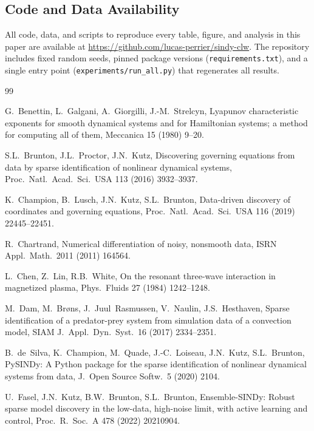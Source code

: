 \documentclass[12pt]{article}
\begin{document}
\subsection*{Code and Data Availability}

All code, data, and scripts to reproduce every table, figure, and analysis in this paper are available at \url{https://github.com/lucas-perrier/sindy-clw}.
The repository includes fixed random seeds, pinned package versions (\texttt{requirements.txt}), and a single entry point (\texttt{experiments/run\_all.py}) that regenerates all results.



\begin{thebibliography}{99}

G.~Benettin, L.~Galgani, A.~Giorgilli, J.-M.~Strelcyn,
Lyapunov characteristic exponents for smooth dynamical systems and for {H}amiltonian systems; a method for computing all of them,
Meccanica 15 (1980) 9--20.

S.L.~Brunton, J.L.~Proctor, J.N.~Kutz,
Discovering governing equations from data by sparse identification of nonlinear dynamical systems,
Proc.\ Natl.\ Acad.\ Sci.\ USA 113 (2016) 3932--3937.

K.~Champion, B.~Lusch, J.N.~Kutz, S.L.~Brunton,
Data-driven discovery of coordinates and governing equations,
Proc.\ Natl.\ Acad.\ Sci.\ USA 116 (2019) 22445--22451.

R.~Chartrand,
Numerical differentiation of noisy, nonsmooth data,
ISRN Appl.\ Math.\ 2011 (2011) 164564.

L.~Chen, Z.~Lin, R.B.~White,
On the resonant three-wave interaction in magnetized plasma,
Phys.\ Fluids 27 (1984) 1242--1248.

M.~Dam, M.~Br{\o}ns, J.~Juul~Rasmussen, V.~Naulin, J.S.~Hesthaven,
Sparse identification of a predator-prey system from simulation data of a convection model,
SIAM J.\ Appl.\ Dyn.\ Syst.\ 16 (2017) 2334--2351.

B.~de~Silva, K.~Champion, M.~Quade, J.-C.~Loiseau, J.N.~Kutz, S.L.~Brunton,
{PySINDy}: A {P}ython package for the sparse identification of nonlinear dynamical systems from data,
J.\ Open Source Softw.\ 5 (2020) 2104.

U.~Fasel, J.N.~Kutz, B.W.~Brunton, S.L.~Brunton,
Ensemble-{SINDy}: Robust sparse model discovery in the low-data, high-noise limit, with active learning and control,
Proc.\ R.\ Soc.\ A 478 (2022) 20210904.


\end{thebibliography}
\end{document}
